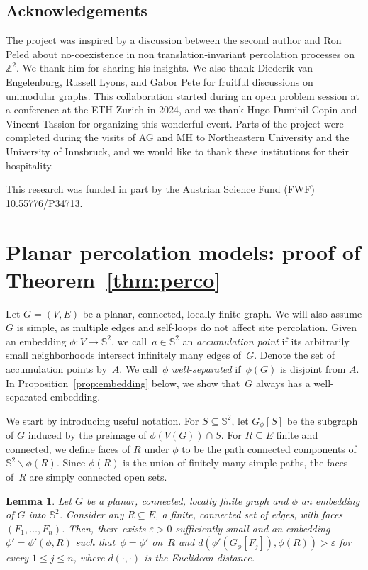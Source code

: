 \documentclass[11pt,letterpaper]{amsart}
\newcounter{n}
\numberwithin{n}{section}
\theoremstyle{plain}
\newtheorem{lemma}[n]{Lemma}
\theoremstyle{definition}
\theoremstyle{remark}
\newcommand\eps\varepsilon
\renewcommand\setminus\smallsetminus
\newcommand{\1}{\mathbbm{1}}
\renewcommand\subset\subseteq
\begin{document}
\subsection*{Acknowledgements}
The project was inspired by a discussion between the second author and Ron Peled about no-coexistence in non translation-invariant percolation processes on $\mathbb{Z}^2$. We thank him for sharing his insights. We also thank Diederik van Engelenburg, Russell Lyons, and Gabor Pete for  fruitful discussions on unimodular graphs.
This collaboration started during an open problem session at a conference at the ETH Zurich in 2024, and we thank Hugo Duminil-Copin and Vincent Tassion for organizing this wonderful event.
Parts of the project were completed during the visits of AG and MH to Northeastern University and the  University of Innsbruck, and we would like to thank these institutions for their hospitality.

This research was funded in part by the Austrian Science Fund (FWF) 10.55776/P34713.


\section{Planar percolation models: proof of Theorem~\ref{thm:perco}}
\label{sec:perco}

Let $G = (V,E)$ be a planar, connected, locally finite graph. We will also assume $G$ is simple, as multiple edges and self-loops do not affect site percolation. Given an embedding $\phi: V \to \mathbb{S}^2$, we call~$a\in \mathbb{S}^2$ an {\em accumulation point} if its arbitrarily small neighborhoods intersect infinitely many edges of~$G$.
Denote the set of accumulation points by~$A$.
We call~$\phi$ {\em well-separated} if~$\phi(G)$ is disjoint from $A$.
In Proposition~\ref{prop:embedding} below, we show that~$G$ always has a well-separated embedding.

We start by introducing useful notation.
For $S \subseteq \mathbb{S}^2$, let $G_{\phi}[S]$ be the subgraph of $G$ induced by the preimage of $\phi(V(G)) \cap S$. 
For $R\subset E$ finite and connected, we define faces of $R$ under $\phi$ to be the path connected components of $\mathbb{S}^2 \setminus \phi(R)$.
Since $\phi(R)$ is the union of finitely many simple paths, the faces of~$R$ are simply connected open sets.

\begin{lemma}\label{lem:sausage}
	Let $G$ be a planar, connected, locally finite graph and $\phi$ an embedding of $G$ into $\mathbb{S}^2$. Consider any $R \subset E$, a finite, connected set of edges, with faces $(F_1, \dots, F_n)$. Then, there exists $\eps >0$ sufficiently small and an embedding $\phi' = \phi'(\phi,R)$ such that~$\phi = \phi'$ on~$R$ and $d (\phi'(G_\phi[F_j]), \phi(R)) > \eps$ 
	for every $1 \leq j \leq n$, where $d(\cdot, \cdot)$ is the Euclidean distance.
\end{lemma}
\end{document}
